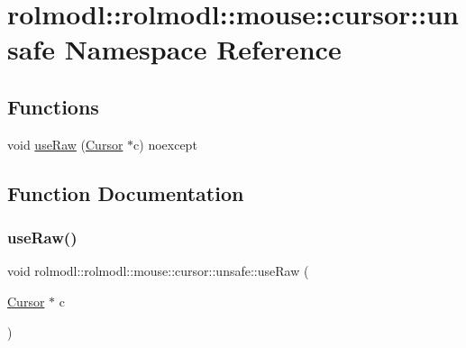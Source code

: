 \hypertarget{namespacerolmodl_1_1rolmodl_1_1mouse_1_1cursor_1_1unsafe}{}\section{rolmodl\+::rolmodl\+::mouse\+::cursor\+::unsafe Namespace Reference}
\label{namespacerolmodl_1_1rolmodl_1_1mouse_1_1cursor_1_1unsafe}
\subsection*{Functions}
\begin{DoxyCompactItemize}
\item 
void \mbox{\hyperlink{namespacerolmodl_1_1rolmodl_1_1mouse_1_1cursor_1_1unsafe_a78fca05cec154bb99bf51d0794c8c40c}{use\+Raw}} (\mbox{\hyperlink{classrolmodl_1_1rolmodl_1_1mouse_1_1_cursor}{Cursor}} $\ast$c) noexcept
\end{DoxyCompactItemize}


\subsection{Function Documentation}
\mbox{\label{namespacerolmodl_1_1rolmodl_1_1mouse_1_1cursor_1_1unsafe_a78fca05cec154bb99bf51d0794c8c40c}} 
\subsubsection{\texorpdfstring{useRaw()}{useRaw()}}
{\footnotesize\ttfamily void rolmodl\+::rolmodl\+::mouse\+::cursor\+::unsafe\+::use\+Raw (\begin{DoxyParamCaption}\item[{\mbox{\hyperlink{classrolmodl_1_1rolmodl_1_1mouse_1_1_cursor}{Cursor}} $\ast$}]{c }\end{DoxyParamCaption})\hspace{0.3cm}{\ttfamily [noexcept]}}

